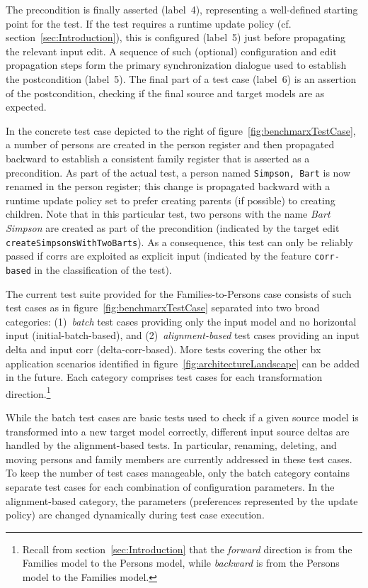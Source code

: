 The precondition is finally asserted (label~4), representing a well-defined starting point for the test. 
If the test requires a runtime update policy (cf. section~\ref{sec:Introduction}), this is configured (label~5) just before propagating the relevant input edit.
A sequence of such (optional) configuration and edit propagation steps form the primary synchronization dialogue used to establish the postcondition (label~5).
The final part of a test case (label~6) is an assertion of the postcondition, checking if the final source and target models are as expected. 

In the concrete test case depicted to the right of figure~\ref{fig:benchmarxTestCase}, a number of persons are created in the person register and then propagated backward to establish a consistent family register that is asserted as a precondition. 
As part of the actual test, a person named \texttt{Simpson, Bart} is now renamed in the person register; this change is propagated backward with a runtime update policy set to prefer creating parents (if possible) to creating children. 
Note that in this particular test, two persons with the name \emph{Bart Simpson} are created as part of the precondition (indicated by the target edit \texttt{createSimpsonsWithTwoBarts}). 
As a consequence, this test can only be reliably passed if corrs are exploited as explicit input (indicated by the feature \texttt{corr-based} in the classification of the test). 

The current test suite provided for the Families-to-Persons case consists of such test cases as in figure~\ref{fig:benchmarxTestCase} separated into two broad categories: (1)~\emph{batch} test cases providing only the input model and no horizontal input (initial-batch-based), and (2)~\emph{alignment-based} test cases providing an input delta and input corr (delta-corr-based).
More tests covering the other bx application scenarios identified in figure~\ref{fig:architectureLandscape} can be added in the future.
Each category comprises test cases for each transformation direction.\footnote{Recall from section~\ref{sec:Introduction} that the \emph{forward} direction is from the Families model to the Persons model, while \emph{backward} is from the Persons model to the Families model.}

While the batch test cases are basic tests used to check if a given source model is transformed into a new target model correctly, different input source deltas are handled by the alignment-based tests. 
In particular, renaming, deleting, and moving persons and family members are currently addressed in these test cases. 
To keep the number of test cases manageable, only the batch category contains separate test cases for each combination of configuration parameters.
In the alignment-based category, the parameters (preferences represented by the update policy) are changed dynamically during test case execution.

